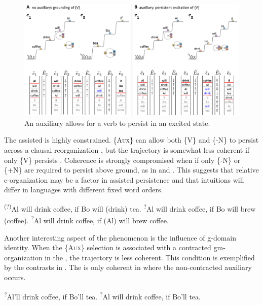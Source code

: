   
\begin{figure}
\includegraphics[width=\textwidth]{figures/Tilsen-img147.png}
\caption{An auxiliary allows for a verb to persist in an excited state.}
\label{fig:7:3}
\end{figure}
 

  The assisted  is highly constrained. \{A\textsc{ux}\} can allow both \{V\} and \{-N\} to persist across a clausal reorganization , but the trajectory is somewhat less coherent if only \{V\} persists . Coherence is strongly compromised when if only \{-N\} or \{+N\} are required to persist above ground, as in  and . This suggests that relative e-organization may be a factor in assisted persistence and that  intuitions will differ in languages with different fixed word orders. 

\ea\label{ex:7:4}
\label{ex:7:4a} \ex\label{ex:7:4b}\textsuperscript{(?)}Al will drink coffee, if Bo will (drink) tea.
\ex\label{ex:7:4c}\textsuperscript{?}Al will drink coffee, if Bo will brew (coffee).
\ex\label{ex:7:4d}\textsuperscript{?}Al will drink coffee, if (Al) will brew coffee.
\z
\z

  Another interesting aspect of the phenomenon is the influence of g-domain identity. When the \{A\textsc{ux}\} selection is associated with a contracted gm-organization in the , the  trajectory is less coherent. This condition is exemplified by the  contrasts in . The  is only coherent in  where the non-contracted auxiliary occurs.

\ea\label{ex:7:5}
\ea\label{ex:7:5a}\textsuperscript{?}Al’ll drink coffee, if Bo’ll tea.      
\ex\label{ex:7:5b}\textsuperscript{?}Al will drink coffee, if Bo’ll tea.
\label{ex:7:5c}
\z
\z

